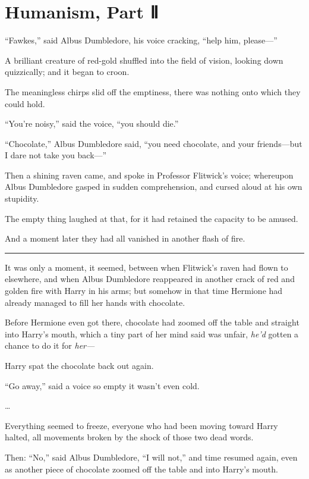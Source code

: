 \chapter{Humanism, Part Ⅱ}\label{humanism-part}

``Fawkes,'' said Albus Dumbledore, his voice cracking, ``help him,
please---''

A brilliant creature of red-gold shuffled into the field of vision,
looking down quizzically; and it began to croon.

The meaningless chirps slid off the emptiness, there was nothing onto
which they could hold.

``You're noisy,'' said the voice, ``you should die.''

``Chocolate,'' Albus Dumbledore said, ``you need chocolate, and your
friends---but I dare not take you back---''

Then a shining raven came, and spoke in Professor Flitwick's voice;
whereupon Albus Dumbledore gasped in sudden comprehension, and cursed
aloud at his own stupidity.

The empty thing laughed at that, for it had retained the capacity to be
amused.

And a moment later they had all vanished in another flash of fire.

\begin{center}\rule{3in}{0.4pt}\end{center}

It was only a moment, it seemed, between when Flitwick's raven had flown
to elsewhere, and when Albus Dumbledore reappeared in another crack of
red and golden fire with Harry in his arms; but somehow in that time
Hermione had already managed to fill her hands with chocolate.

Before Hermione even got there, chocolate had zoomed off the table and
straight into Harry's mouth, which a tiny part of her mind said was
unfair, \emph{he'd} gotten a chance to do it for \emph{her---}

Harry spat the chocolate back out again.

``Go away,'' said a voice so empty it wasn't even cold.

\ldots{}

Everything seemed to freeze, everyone who had been moving toward Harry
halted, all movements broken by the shock of those two dead words.

Then: ``No,'' said Albus Dumbledore, ``I will not,'' and time resumed
again, even as another piece of chocolate zoomed off the table and into
Harry's mouth.

